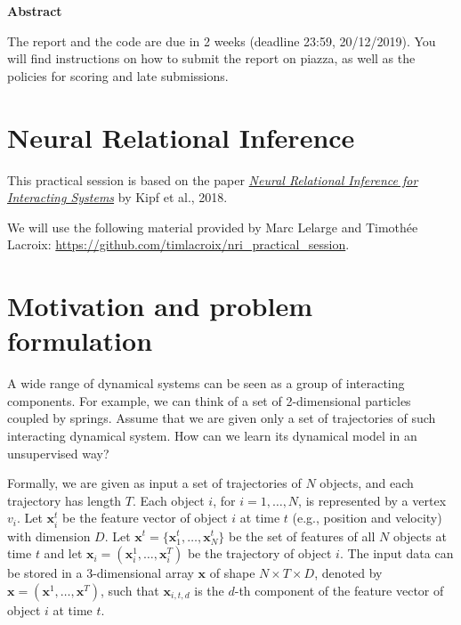 \documentclass[a4paper, 11pt]{article}
\renewenvironment{abstract}{
\vspace{.5cm}
\begin{center}
\textbf{Abstract} \\
\vspace{.1cm}
}{\end{center}}
\begin{document}

\maketitle

\begin{abstract}
	The report and the code are due in 2 weeks (deadline 23:59, 20/12/2019). You will find instructions on how to submit the report on piazza, as well as the policies for scoring and late submissions.
\end{abstract}

\section{Neural Relational Inference}

This practical session is based on the paper \href{https://arxiv.org/pdf/1802.04687.pdf}{\emph{Neural Relational Inference for Interacting Systems}} by Kipf et al., 2018.

We will use the following material provided by Marc Lelarge and Timoth\'ee Lacroix: \url{https://github.com/timlacroix/nri_practical_session}. 

\section{Motivation and problem formulation}
A wide range of dynamical systems can be seen as a group of interacting components. For example, we can think of a set of 2-dimensional particles coupled by springs. Assume that we are given only a set of trajectories of such interacting dynamical system. How can we learn its dynamical model in an unsupervised way?

Formally, we are given as input a set of trajectories of $N$ objects, and each trajectory has length $T$. Each object $i$, for $i=1,\ldots, N$, is represented by a vertex $v_i$. Let $\mathbf{x}_i^t$ be the feature vector of object $i$ at time $t$ (e.g., position and velocity) with dimension $D$. Let $\mathbf{x}^t = \{\mathbf{x}_1^t, \ldots, \mathbf{x}_N^t\}$ be the set of features of all $N$ objects at time $t$ and let $\mathbf{x}_i = (\mathbf{x}_i^1, \ldots, \mathbf{x}_i^T)$ be the trajectory of object $i$. The input data can be stored in a 3-dimensional array $\mathbf{x}$ of shape $N\times T \times D$, denoted by $\mathbf{x} = (\mathbf{x}^1, \ldots, \mathbf{x}^T)$, such that $\mathbf{x}_{i,t,d}$ is the $d$-th component of the feature vector of object $i$ at time $t$. 
\end{document}
